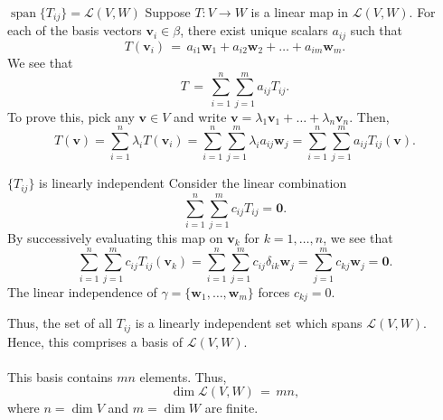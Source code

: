\documentclass[handout]{beamer}
\def\v{\bm{v}}
\def\w{\bm{w}}
\def\L{\mathcal{L}}
\def\dim{\operatorname{dim}}
\def\spn{\operatorname{span}}
\begin{document}
        \begin{frame}{$\spn\{T_{ij}\} = \L(V, W)$}
                Suppose $T\colon V \to W$ is a linear map in $\L(V, W)$. For each of the basis vectors $\v_i \in \beta$, there exist unique
                scalars $a_{ij}$ such that
                \[
                        T(\v_i) \,=\, a_{i1}\w_1 + a_{i2}\w_2 + \dots + a_{im}\w_m.
                \]
                \pause
                We see that
                \[
                        T \,=\, \sum_{i = 1}^n \sum_{j = 1}^m a_{ij} T_{ij}.
                \]
                \pause
                To prove this, pick any $\v \in V$ and write $\v = \lambda_1\v_1 + \dots + \lambda_n\v_n$. Then,
                \[
                        T(\v) = \sum_{i = 1}^n \lambda_i T(\v_i) = \sum_{i = 1}^n \sum_{j = 1}^m \lambda_i a_{ij}\w_j
                                = \sum_{i = 1}^n \sum_{j = 1}^m a_{ij} T_{ij}(\v).
                \]
        \end{frame}

        \begin{frame}{$\{T_{ij}\}$ is linearly independent}
                Consider the linear combination 
                \[
                        \sum_{i = 1}^n \sum_{j = 1}^m c_{ij} T_{ij} = \mathbf{0}.
                \]
                \pause
                By successively evaluating this map on $\v_k$ for $k = 1, \dots, n$, we see that
                \[
                        \sum_{i = 1}^n \sum_{j = 1}^m c_{ij} T_{ij}(\v_k) = 
                        \sum_{i = 1}^n \sum_{j = 1}^m c_{ij} \delta_{ik}\w_j = \sum_{j = 1}^m c_{kj}\w_j = \mathbf{0}.
                \]
                The linear independence of $\gamma = \{\w_1, \dots, \w_m\}$ forces $c_{kj} = 0$.
        \end{frame}

        \begin{frame}
                Thus, the set of all $T_{ij}$ is a linearly independent set which spans $\L(V, W)$.
                Hence, this comprises a basis of $\L(V, W)$. \\~\\

                This basis contains $mn$ elements. Thus,
                \[
                        \dim\L(V, W) \,=\, mn,
                \]
                where $n = \dim{V}$ and $m = \dim{W}$ are finite.
        \end{frame}
\end{document}
